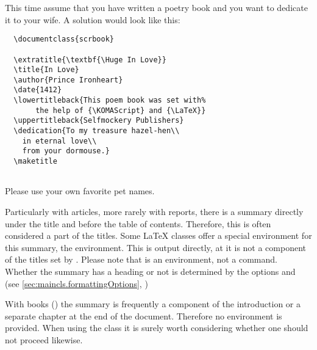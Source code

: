 \begin{Example}
  This time assume that you have written a poetry book and you want to
  dedicate it to your wife. A solution would look like this:
\begin{lstlisting}
  \documentclass{scrbook}
  
  \extratitle{\textbf{\Huge In Love}}
  \title{In Love}
  \author{Prince Ironheart}
  \date{1412}
  \lowertitleback{This poem book was set with%
       the help of {\KOMAScript} and {\LaTeX}}
  \uppertitleback{Selfmockery Publishers}
  \dedication{To my treasure hazel-hen\\
    in eternal love\\
    from your dormouse.}
  \maketitle
  
\end{lstlisting}
  Please use your own favorite pet names.
\end{Example}
%
%


\begin{Declaration}
\end{Declaration}%
%
Particularly with
articles, more rarely with reports, there is a summary
directly under the title and before the table of contents. Therefore,
this is often considered a part of the titles. Some {\LaTeX} classes
offer a special environment for this summary, the
 environment. This is output directly, at it is
not a component of the titles set by .  Please note
that  is an environment, not a command. Whether
the summary has a heading or not is determined by the options
 and  (see
\autoref{sec:maincls.formattingOptions},
)

With books () the summary is frequently a component of
the introduction or a separate chapter at the end of the document.
Therefore no  environment is provided. When
using the class  it is surely worth considering
whether one should not proceed likewise.
%


